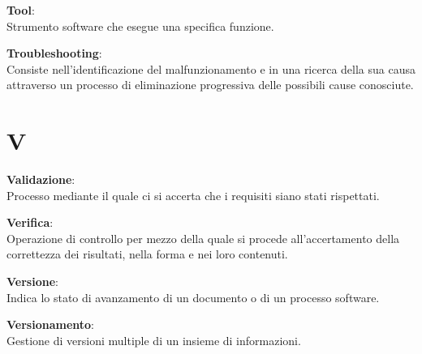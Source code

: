 \documentclass[a4paper, oneside, openany, dvipsnames, table]{article}
\begin{document}
\textbf{Tool}:\\	Strumento software che esegue una specifica funzione.

\textbf{Troubleshooting}:\\	Consiste nell'identificazione del malfunzionamento e in una ricerca della sua causa attraverso un processo di eliminazione progressiva delle possibili cause conosciute.


\newpage
\section{V}
\textbf{Validazione}:\\	Processo mediante il quale ci si accerta che i requisiti siano stati rispettati.

\textbf{Verifica}:\\	Operazione di controllo per mezzo della quale si procede all'accertamento della correttezza dei risultati, nella forma e nei loro contenuti.

\textbf{Versione}:\\ Indica lo stato di avanzamento di un documento o di un processo software.

\textbf{Versionamento}:\\	Gestione di versioni multiple di un insieme di informazioni.
\end{document}
